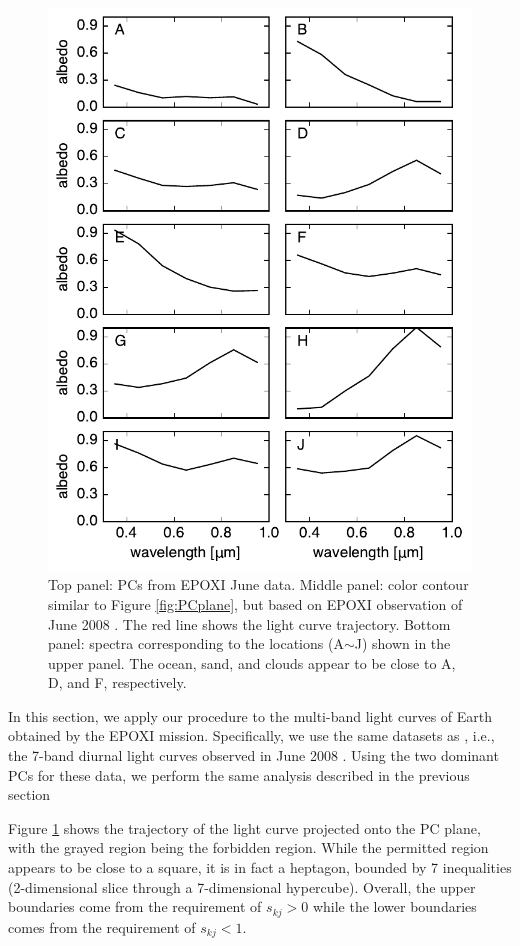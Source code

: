 \documentclass[iop,numberedappendix,apj]{emulateapj}
\begin{document}
\begin{figure}[tbh!]
\begin{center}
	\includegraphics[width=0.85\hsize]{raddata_2_norm_spectra.pdf}
    \end{center}
    \caption{Top panel: PCs from EPOXI June data. Middle panel: color contour similar to Figure \ref{fig:PCplane}, but based on EPOXI observation of June 2008 \citep{Livengood2011}. The red line shows the light curve trajectory. Bottom panel: spectra corresponding to the locations (A$\sim$J) shown in the upper panel. The ocean, sand, and clouds appear to be close to A, D, and F, respectively. }
\label{fig:EPOXI}
\end{figure}

In this section, we apply our procedure to the multi-band light curves of Earth obtained by the EPOXI mission. 
Specifically, we use the same datasets as \citet{Cowan2013}, i.e., the 7-band diurnal light curves observed in June 2008 \citep{Livengood2011}. 
Using the two dominant PCs for these data, we perform the same analysis described in the previous section 

Figure \ref{fig:EPOXI} shows the trajectory of the light curve projected onto the PC plane, with the grayed region being the forbidden region. 
While the permitted region appears to be close to a square, it is in fact a heptagon, bounded by 7 inequalities (2-dimensional slice through a 7-dimensional hypercube). 
Overall, the upper boundaries come from the requirement of $s_{kj}>0$ while the lower boundaries comes from the requirement of $s_{kj}<1$. 
\end{document}
